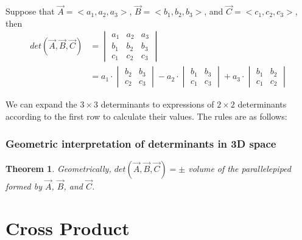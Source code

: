 \documentclass{article}
\newtheorem*{theorem}{Theorem}
\begin{document}
Suppose that $\vec{A} = <a_1, a_2, a_3>$, $\vec{B} = <b_1, b_2, b_3>$, and 
$\vec{C} = <c_1, c_2, c_3>$, then
\[
  \begin{split}
  det(\vec{A}, \vec{B}, \vec{C}) &= \begin{vmatrix}
                                    a_1 & a_2 & a_3 \\
                                    b_1 & b_2 & b_3 \\
                                    c_1 & c_2 & c_3
                                    \end{vmatrix} \\
                                 &= a_1 \cdot \begin{vmatrix}
                                              b_2 & b_3 \\
                                              c_2 & c_3
                                              \end{vmatrix} - 
                                    a_2 \cdot \begin{vmatrix}
                                              b_1 & b_3 \\
                                              c_1 & c_3
                                              \end{vmatrix} +
                                    a_3 \cdot \begin{vmatrix}
                                              b_1 & b_2 \\
                                              c_1 & c_2
                                              \end{vmatrix}
  \end{split}
\]

We can expand the $3 \times 3$ determinants to expressions of $2 \times 2$
determinants according to the first row to calculate their values. The rules
are as follows: 

\subsubsection{Geometric interpretation of determinants in 3D space}

\begin{theorem}
Geometrically, $det(\vec{A}, \vec{B}, \vec{C}) = \pm$ volume of the
parallelepiped formed by $\vec{A}$, $\vec{B}$, and $\vec{C}$.
\end{theorem}

\section{Cross Product}
\end{document}

